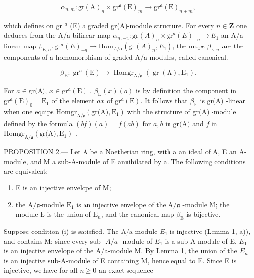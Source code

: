 \[
\alpha_ {n, m}: \mathrm{gr} (\mathrm{A}) _ {n} \times \mathrm{gr} ^ {\mathfrak {a}} (\mathrm{E}) _ {m} \longrightarrow \mathrm{gr} ^ {\mathfrak {a}} (\mathrm{E}) _ {n + m},\tag{1}
\]

which defines on gr \(^{a}\) (E) a graded gr(A)-module structure. For every \(n \in \mathbf{Z}\) one deduces from the A/a-bilinear map \(\alpha_{n,-n} : \text{gr}(A)_n \times \text{gr}^{a}(E)_{-n} \longrightarrow E_1\) an A/a-linear map \(\beta_{E,n} : \text{gr}^{a}(E)_{-n} \longrightarrow \text{Hom}_{A/\alpha}(\text{gr}(A)_n, E_1)\); the maps \(\beta_{E,n}\) are the components of a homomorphism of graded A/a-modules, called canonical.

\[
\beta_ {\mathrm{E}}: \operatorname{gr} ^ {a} (\mathrm{E}) \longrightarrow \operatorname{Homgr} _ {\mathrm{A} / \mathfrak{a}} (\operatorname{gr} (\mathrm{A}), \mathrm{E} _ {1}).\tag{2}
\]

For \(a \in \text{gr(A)}\), \(x \in \text{gr}^{\mathfrak{a}}(\text{E})\) , \(\beta_{\text{E}}(x)(a)\) is by definition the component in \(\text{gr}^{\mathfrak{a}}(\text{E})_0 = \text{E}_1\) of the element \(ax\) of \(\text{gr}^{\mathfrak{a}}(\text{E})\). It follows that \(\beta_{\text{E}}\) is \(\text{gr(A)}\) -linear when one equips \(\text{Homgr}_{\text{A}/\mathfrak{a}}(\text{gr(A)}, \text{E}_1)\) with the structure of \(\text{gr(A)}\) -module defined by the formula \((bf)(a) = f(ab)\) for \(a, b\) in \(\text{gr(A)}\) and \(f\) in \(\text{Homgr}_{\text{A}/\mathfrak{a}}(\text{gr(A)}, \text{E}_1)\) .

PROPOSITION 2.--- Let A be a Noetherian ring, with a an ideal of A, E an A-module, and M a sub-A-module of E annihilated by a. The following conditions are equivalent:

\begin{enumerate}
\def\labelenumi{(\roman{enumi})}
\item
  E is an injective envelope of M;
\item
  the \(\mathrm{A}/\mathfrak{a}\)-module \(\mathrm{E}_1\) is an injective envelope of the \(\mathrm{A}/\mathfrak{a}\) -module \(\mathrm{M}\); the module \(\mathrm{E}\) is the union of \(\mathrm{E}_n\), and the canonical map \(\beta_{\mathrm{E}}\) is bijective.
\end{enumerate}

Suppose condition (i) is satisfied. The A/a-module \(E_{1}\) is injective (Lemma 1, a)), and contains M; since every sub- \(A/a\) -module of \(E_{1}\) is a sub-A-module of E, \(E_{1}\) is an injective envelope of the A/a-module M. By Lemma 1, the union of the \(E_{n}\) is an injective sub-A-module of E containing M, hence equal to E. Since E is injective, we have for all \(n \geqslant 0\) an exact sequence

